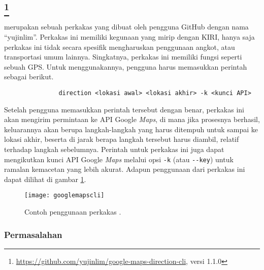 \subsection[\googlemapscli]{\googlemapscli\footnote{\href{https://github.com/yujinlim/google-maps-direction-cli}{https://github.com/yujinlim/google-maps-direction-cli}, versi 1.1.0}}
\label{sec:similarapps-googlemapscli}

\googlemapscli\xspace merupakan sebuah perkakas \cl\xspace yang dibuat oleh pengguna GitHub dengan nama ``yujinlim''. Perkakas ini memiliki kegunaan yang mirip dengan KIRI, hanya saja perkakas ini tidak secara spesifik mengharuskan penggunaan angkot, atau transportasi umum lainnya. Singkatnya, perkakas ini memiliki fungsi seperti sebuah GPS. Untuk menggunakannya, pengguna harus memasukkan perintah sebagai berikut.

\begin{verbatim}
               direction <lokasi awal> <lokasi akhir> -k <kunci API>
\end{verbatim}

Setelah pengguna memasukkan perintah tersebut dengan benar, perkakas ini akan mengirim permintaan ke API Google \textit{Maps}, di mana jika prosesnya berhasil, keluarannya akan berupa langkah-langkah yang harus ditempuh untuk sampai ke lokasi akhir, beserta di jarak berapa langkah tersebut harus diambil, relatif terhadap langkah sebelumnya. Perintah untuk perkakas ini juga dapat mengikutkan kunci API Google \textit{Maps} melalui opsi \texttt{-k} (atau \verb|--key|) untuk ramalan kemacetan yang lebih akurat. Adapun penggunaan dari perkakas ini dapat dilihat di gambar \ref{fig:similarapps-googlemapscli}.
\vspace*{0.5em} %
\begin{figure}[ht]
    \centering
    \texttt{[image: googlemapscli]}
    \caption[Contoh penggunaan perkakas \googlemapscli]{Contoh penggunaan perkakas \googlemapscli\protect\footnotemark.}
    \label{fig:similarapps-googlemapscli}
\end{figure}

\subsubsection{Permasalahan}
\label{sec:similarapps-googlemapscli-problem}

